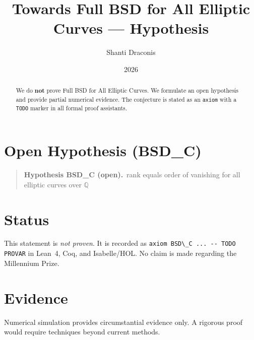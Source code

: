 \documentclass[11pt]{article}
\title{Towards Full BSD for All Elliptic Curves — Hypothesis}
\author{Shanti Draconis}
\date{2026}
\begin{document}
\maketitle

\begin{abstract}
We do \textbf{not} prove Full BSD for All Elliptic Curves.
We formulate an open hypothesis and provide partial numerical evidence.
The conjecture is stated as an \texttt{axiom} with a \texttt{TODO}
marker in all formal proof assistants.
\end{abstract}

\section{Open Hypothesis (BSD\_C)}
\begin{quote}
  \textbf{Hypothesis BSD\_C (open).}~rank equals order of vanishing for all elliptic curves over $\mathbb{Q}$
\end{quote}

\section{Status}
This statement is \emph{not proven}.  It is recorded as
\verb|axiom BSD\_C ... -- TODO PROVAR| in Lean~4, Coq, and Isabelle/HOL.
No claim is made regarding the Millennium Prize.

\section{Evidence}
Numerical simulation provides circumstantial evidence only.
A rigorous proof would require techniques beyond current methods.
\end{document}

